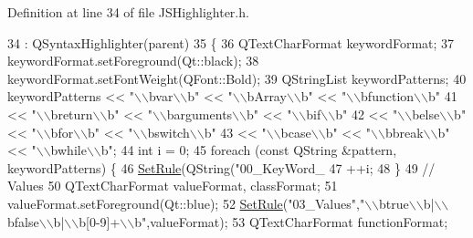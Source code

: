 Definition at line 34 of file J\+S\+Highlighter.\+h.


\begin{DoxyCode}
34                                             : QSyntaxHighlighter(parent)
35     \{
36         QTextCharFormat keywordFormat;
37         keywordFormat.setForeground(Qt::black);
38         keywordFormat.setFontWeight(QFont::Bold);
39         QStringList keywordPatterns;
40         keywordPatterns << \textcolor{stringliteral}{"\(\backslash\)\(\backslash\)bvar\(\backslash\)\(\backslash\)b"} << \textcolor{stringliteral}{"\(\backslash\)\(\backslash\)bArray\(\backslash\)\(\backslash\)b"} << \textcolor{stringliteral}{"\(\backslash\)\(\backslash\)bfunction\(\backslash\)\(\backslash\)b"}
41                         << \textcolor{stringliteral}{"\(\backslash\)\(\backslash\)breturn\(\backslash\)\(\backslash\)b"} << \textcolor{stringliteral}{"\(\backslash\)\(\backslash\)barguments\(\backslash\)\(\backslash\)b"} << \textcolor{stringliteral}{"\(\backslash\)\(\backslash\)bif\(\backslash\)\(\backslash\)b"}
42                         << \textcolor{stringliteral}{"\(\backslash\)\(\backslash\)belse\(\backslash\)\(\backslash\)b"} << \textcolor{stringliteral}{"\(\backslash\)\(\backslash\)bfor\(\backslash\)\(\backslash\)b"} << \textcolor{stringliteral}{"\(\backslash\)\(\backslash\)bswitch\(\backslash\)\(\backslash\)b"}
43                         << \textcolor{stringliteral}{"\(\backslash\)\(\backslash\)bcase\(\backslash\)\(\backslash\)b"} << \textcolor{stringliteral}{"\(\backslash\)\(\backslash\)bbreak\(\backslash\)\(\backslash\)b"} << \textcolor{stringliteral}{"\(\backslash\)\(\backslash\)bwhile\(\backslash\)\(\backslash\)b"};
44         \textcolor{keywordtype}{int} i = 0;
45         \textcolor{keywordflow}{foreach} (\textcolor{keyword}{const} QString &pattern, keywordPatterns) \{
46             \hyperlink{class_j_s_highlighter_aab4501a701fd36da2510f3bd26422e7a}{SetRule}(QString(\textcolor{stringliteral}{"00\_KeyWord\_%
47             ++i;
48         \}
49         \textcolor{comment}{// Values}
50         QTextCharFormat valueFormat, classFormat;
51         valueFormat.setForeground(Qt::blue);
52         \hyperlink{class_j_s_highlighter_aab4501a701fd36da2510f3bd26422e7a}{SetRule}(\textcolor{stringliteral}{"03\_Values"},\textcolor{stringliteral}{"\(\backslash\)\(\backslash\)btrue\(\backslash\)\(\backslash\)b|\(\backslash\)\(\backslash\)bfalse\(\backslash\)\(\backslash\)b|\(\backslash\)\(\backslash\)b[0-9]+\(\backslash\)\(\backslash\)b"},valueFormat);
53         QTextCharFormat functionFormat;
}
\end{DoxyCode}
